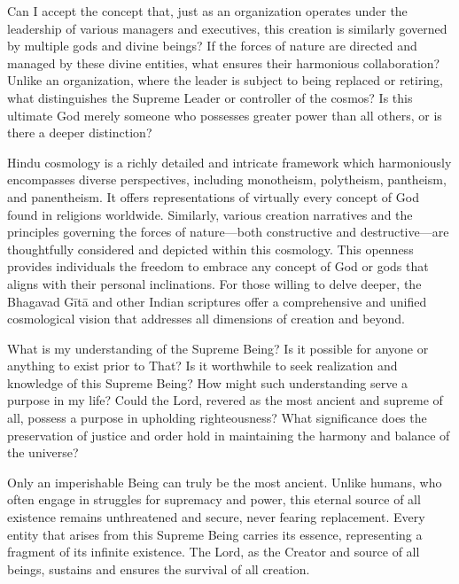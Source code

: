 \newpage
\begin{mananam}{}
\normalfont\mananamtext Can I accept the concept that, just as an organization operates under the leadership of various managers and executives, this creation is similarly governed by multiple gods and divine beings? If the forces of nature are directed and managed by these divine entities, what ensures their harmonious collaboration? Unlike an organization, where the leader is subject to being replaced or retiring, what distinguishes the Supreme Leader or controller of the cosmos? Is this ultimate God merely someone who possesses greater power than all others, or is there a deeper distinction?
\end{mananam}
\sreflect
\begin{inspiration}{}
\normalfont\mananamtext Hindu cosmology is a richly detailed and intricate framework which harmoniously encompasses diverse perspectives, including monotheism, polytheism, pantheism, and panentheism. It offers representations of virtually every concept of God found in religions worldwide. Similarly, various creation narratives and the principles governing the forces of nature—both constructive and destructive—are thoughtfully considered and depicted within this cosmology. This openness provides individuals the freedom to embrace any concept of God or gods that aligns with their personal inclinations. For those willing to delve deeper, the Bhagavad Gītā and other Indian scriptures offer a comprehensive and unified cosmological vision that addresses all dimensions of creation and beyond.
\end{inspiration}
\newpage
\begin{mananam}{}
\normalfont\mananamtext What is my understanding of the Supreme Being? Is it possible for anyone or anything to exist prior to That? Is it worthwhile to seek realization and knowledge of this Supreme Being? How might such understanding serve a purpose in my life? Could the Lord, revered as the most ancient and supreme of all, possess a purpose in upholding righteousness? What significance does the preservation of justice and order hold in maintaining the harmony and balance of the universe?
\end{mananam}
\sreflect
\begin{inspiration}{}
\normalfont\mananamtext Only an imperishable Being can truly be the most ancient. Unlike humans, who often engage in struggles for supremacy and power, this eternal source of all existence remains unthreatened and secure, never fearing replacement. Every entity that arises from this Supreme Being carries its essence, representing a fragment of its infinite existence. The Lord, as the Creator and source of all beings, sustains and ensures the survival of all creation.
\end{inspiration}
\newpage

